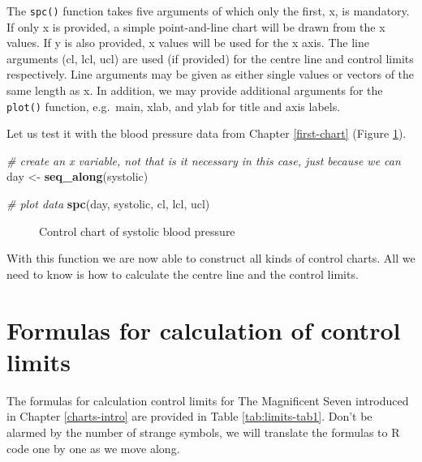 \documentclass[
]{book}
\makeatletter
\newenvironment{Shaded}{\begin{snugshade}}{\end{snugshade}}
\newcommand{\CommentTok}[1]{\textcolor[rgb]{0.56,0.35,0.01}{\textit{#1}}}
\newcommand{\FunctionTok}[1]{\textcolor[rgb]{0.13,0.29,0.53}{\textbf{#1}}}
\newcommand{\NormalTok}[1]{#1}
\newcommand{\OtherTok}[1]{\textcolor[rgb]{0.56,0.35,0.01}{#1}}
\newcommand*\pandocbounded[1]{%
  \sbox\pandoc@box{#1}%
  \Gscale@div\@tempa{\textheight}{\dimexpr\ht\pandoc@box+\dp\pandoc@box\relax}%
  \Gscale@div\@tempb{\linewidth}{\wd\pandoc@box}%
  \ifdim\@tempb\p@<\@tempa\p@\let\@tempa\@tempb\fi%
  \ifdim\@tempa\p@<\p@\scalebox{\@tempa}{\usebox\pandoc@box}%
  \else\usebox{\pandoc@box}%
  \fi%
}
\makeatother
\begin{document}
The \texttt{spc()} function takes five arguments of which only the first, x, is mandatory. If only x is provided, a simple point-and-line chart will be drawn from the x values. If y is also provided, x values will be used for the x axis. The line arguments (cl, lcl, ucl) are used (if provided) for the centre line and control limits respectively. Line arguments may be given as either single values or vectors of the same length as x. In addition, we may provide additional arguments for the \texttt{plot()} function, e.g.~main, xlab, and ylab for title and axis labels.

Let us test it with the blood pressure data from Chapter \ref{first-chart} (Figure \ref{fig:limits-fig1}).

\begin{Shaded}
\begin{Highlighting}[]
\CommentTok{\# create an x variable, not that is it necessary in this case, just because we can}
\NormalTok{day }\OtherTok{\textless{}{-}} \FunctionTok{seq\_along}\NormalTok{(systolic)}

\CommentTok{\# plot data}
\FunctionTok{spc}\NormalTok{(day, systolic, cl, lcl, ucl)}
\end{Highlighting}
\end{Shaded}

\begin{figure}
\centering
\pandocbounded{}
\caption{\label{fig:limits-fig1}Control chart of systolic blood pressure}
\end{figure}

With this function we are now able to construct all kinds of control charts. All we need to know is how to calculate the centre line and the control limits.

\section{Formulas for calculation of control limits}\label{formulas-for-calculation-of-control-limits}

The formulas for calculation control limits for The Magnificent Seven introduced in Chapter \ref{charts-intro} are provided in Table \ref{tab:limits-tab1}. Don't be alarmed by the number of strange symbols, we will translate the formulas to R code one by one as we move along.
\end{document}
